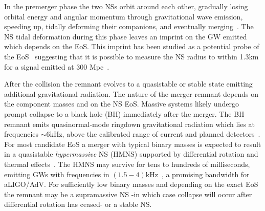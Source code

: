 \documentclass[aps,prd,amsmath,floats,floatfix, twocolumn,
superscriptaddress,nofootinbib,showpacs]{revtex4-1}
\begin{document}
In the premerger phase the two NSs orbit around each other, gradually losing orbital energy and angular momentum through gravitational wave emission, speeding up, tidally deforming their companions, and eventually merging~\cite{lrr-2014-2}. The NS tidal deformation during this phase leaves an imprint on the GW emitted~\cite{2008PhRvD..77b1502F} which depends on the EoS. This imprint has been studied as a potential probe of the EoS~\cite{PhysRevLett.111.071101,2015arXiv150305405A,2014PhRvD..89j3012W,2015PhRvD..91d3002L,Chatziioannou:2015uea} suggesting that it is possible to measure the NS radius to within 1.3km for a signal emitted at 300 Mpc~\cite{2013PhRvD..88d4042R}.

After the collision the remnant evolves to a quasistable or stable state emitting additional gravitational radiation. The nature of the merger remnant depends on the component masses and on the NS EoS. Massive systems likely undergo prompt collapse to a black hole (BH) immediately after the merger. The BH remnant emits quasinormal-mode ringdown gravitational radiation which lies at frequencies $\sim 6$kHz, above the calibrated range of current and planned detectors~\cite{shibata:06bns,PhysRevD.78.084033}. For most candidate EoS a merger with typical binary masses is expected to result in a quasistable \emph{hypermassive} NS (HMNS) supported by differential rotation and thermal effects~\cite{2000ApJ...528L..29B}. The HMNS may survive for tens to hundreds of milliseconds, emitting GWs with frequencies in $(1.5-4)$kHz~\cite{1994PhRvD..50.6247Z,1996A&A...311..532R,2005PhRvL..94t1101S,2005PhRvD..71h4021S,shibata:06bns,2007PhRvL..99l1102O,2011MNRAS.418..427S,2011PhRvD..83l4008H,2012PhRvL.108a1101B,bauswein:12,2013PhRvL.111m1101B,PhysRevD.78.084033,2011PhRvL.107e1102S,hotokezaka:13,2014PhRvL.113i1104T,2014arXiv1412.3240T,2015arXiv150401764B,bauswein:15,Foucart2016,Lehner:2016lxy,Kawamura2016,2016CQGra..33x4004E,Radice:2016rys,Dietrich2017,Maione2017}, a promising bandwidth for aLIGO/AdV. For sufficiently low binary masses and depending on the exact EoS the remnant may be a supramassive NS -in which case collapse will occur after differential rotation has ceased- or a stable NS. 
\end{document}
